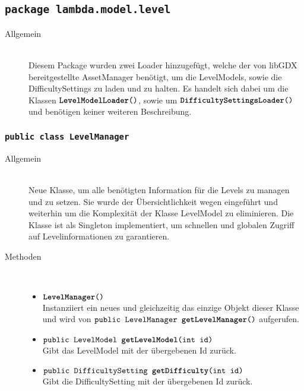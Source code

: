 \subsection{\texttt{package lambda.model.level}}

\begin{description}
\item[Allgemein] \hfill \\ Diesem Package wurden zwei Loader hinzugefügt, welche der von libGDX bereitgestellte AssetManager benötigt, um die LevelModels, sowie die DifficultySettings zu laden und zu halten. Es handelt sich dabei um die Klassen $\texttt{\textbf{LevelModelLoader}()}$, sowie um $\texttt{\textbf{DifficultySettingsLoader}()}$ und benötigen keiner weiteren Beschreibung.
\end{description}

\subsubsection{\normalfont \texttt{public class \textbf{LevelManager}}}

\begin{description}

\item[Allgemein] \hfill \\ Neue Klasse, um alle benötigten Information für die Levels zu managen und zu setzen. Sie wurde der Übersichtlichkeit wegen eingeführt und weiterhin um die Komplexität der Klasse LevelModel zu eliminieren. Die Klasse ist als Singleton implementiert, um schnellen und globalen Zugriff auf Levelinformationen zu garantieren.
\item[Methoden] \hfill \\
	\vspace{-.8cm}
	\begin{itemize}
		\item $\texttt{\textbf{LevelManager}()}$ \\ Instanziiert ein neues und gleichzeitig das einzige Objekt dieser Klasse und wird von $\texttt{public LevelManager \textbf{getLevelManager}()}$ aufgerufen.
		\item $\texttt{public LevelModel \textbf{getLevelModel}(int id)}$ \\ Gibt das LevelModel mit der übergebenen Id zurück.
		\item $\texttt{public DifficultySetting \textbf{getDifficulty}(int id)}$ \\ Gibt die DifficultySetting mit der übergebenen Id zurück.
	\end{itemize}
\end{description}

